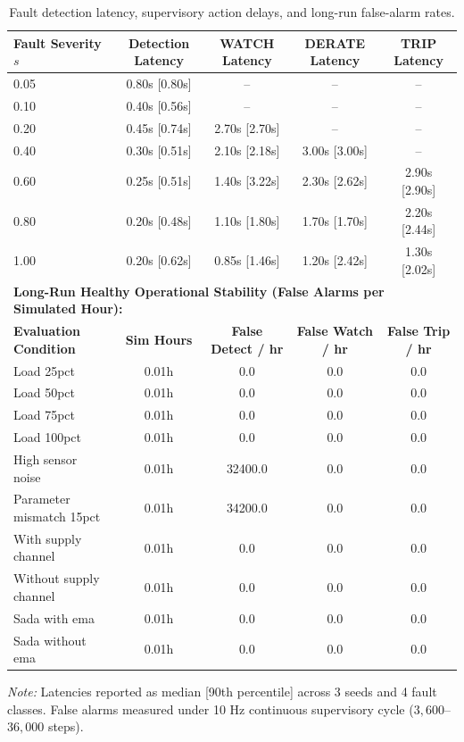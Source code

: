 \begin{table}[t]
\centering
\small
\caption{Fault detection latency, supervisory action delays, and long-run false-alarm rates.}
\label{tab:latency_study}
\begin{tabular}{lcccc}
\toprule
\textbf{Fault Severity $s$} & \textbf{Detection Latency} & \textbf{WATCH Latency} & \textbf{DERATE Latency} & \textbf{TRIP Latency} \\
\midrule
0.05 & 0.80s [0.80s] & -- & -- & -- \\
0.10 & 0.40s [0.56s] & -- & -- & -- \\
0.20 & 0.45s [0.74s] & 2.70s [2.70s] & -- & -- \\
0.40 & 0.30s [0.51s] & 2.10s [2.18s] & 3.00s [3.00s] & -- \\
0.60 & 0.25s [0.51s] & 1.40s [3.22s] & 2.30s [2.62s] & 2.90s [2.90s] \\
0.80 & 0.20s [0.48s] & 1.10s [1.80s] & 1.70s [1.70s] & 2.20s [2.44s] \\
1.00 & 0.20s [0.62s] & 0.85s [1.46s] & 1.20s [2.42s] & 1.30s [2.02s] \\
\midrule
\multicolumn{5}{l}{\textbf{Long-Run Healthy Operational Stability (False Alarms per Simulated Hour):}} \\
\midrule
\textbf{Evaluation Condition} & \textbf{Sim Hours} & \textbf{False Detect / hr} & \textbf{False Watch / hr} & \textbf{False Trip / hr} \\
\midrule
Load 25pct & 0.01h & 0.0 & 0.0 & 0.0 \\
Load 50pct & 0.01h & 0.0 & 0.0 & 0.0 \\
Load 75pct & 0.01h & 0.0 & 0.0 & 0.0 \\
Load 100pct & 0.01h & 0.0 & 0.0 & 0.0 \\
High sensor noise & 0.01h & 32400.0 & 0.0 & 0.0 \\
Parameter mismatch 15pct & 0.01h & 34200.0 & 0.0 & 0.0 \\
With supply channel & 0.01h & 0.0 & 0.0 & 0.0 \\
Without supply channel & 0.01h & 0.0 & 0.0 & 0.0 \\
Sada with ema & 0.01h & 0.0 & 0.0 & 0.0 \\
Sada without ema & 0.01h & 0.0 & 0.0 & 0.0 \\
\bottomrule
\end{tabular}
\begin{tablenotes}
\small
\item \textit{Note:} Latencies reported as median [90th percentile] across 3 seeds and 4 fault classes.
False alarms measured under 10 Hz continuous supervisory cycle ($3{,}600$--$36{,}000$ steps).
\end{tablenotes}
\end{table}
